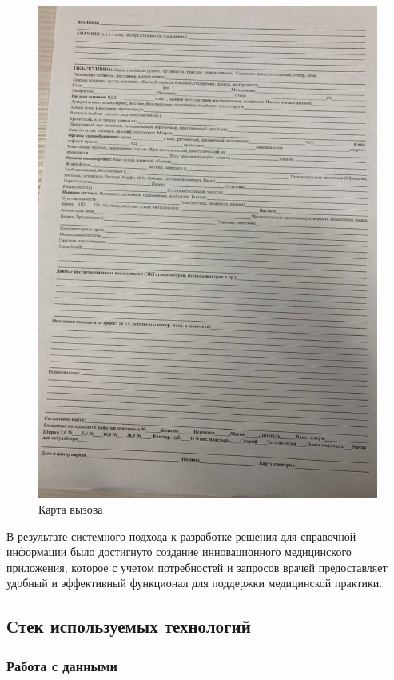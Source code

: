      \begin{figure}
        \includegraphics[scale=0.6]{styles/diploma/inc/card_medics.jpg}
        \caption{Карта вызова}
        \label{fig:fig09}
    \end{figure}




В результате системного подхода к разработке решения для справочной информации было достигнуто создание инновационного медицинского приложения, которое с учетом потребностей и запросов врачей предоставляет удобный и эффективный функционал для поддержки медицинской практики.

\subsection{Стек используемых технологий}
\subsubsection{Работа с данными}

